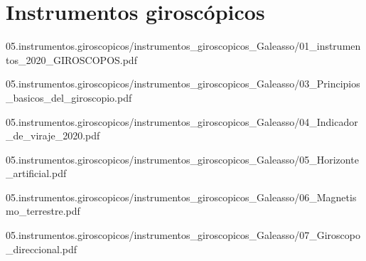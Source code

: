 


\chapter{Instrumentos girosc\'opicos}
\label{sec:instrumentos.giroscopicos}



\begin{landscape}

  
  {05.instrumentos.giroscopicos/instrumentos_giroscopicos_Galeasso/01_instrumentos_2020_GIROSCOPOS.pdf}

  
  {05.instrumentos.giroscopicos/instrumentos_giroscopicos_Galeasso/03_Principios_basicos_del_giroscopio.pdf}

  
  {05.instrumentos.giroscopicos/instrumentos_giroscopicos_Galeasso/04_Indicador_de_viraje_2020.pdf}

\end{landscape}

  
  {05.instrumentos.giroscopicos/instrumentos_giroscopicos_Galeasso/05_Horizonte_artificial.pdf}

  \begin{landscape}

  
  {05.instrumentos.giroscopicos/instrumentos_giroscopicos_Galeasso/06_Magnetismo_terrestre.pdf}

  
  {05.instrumentos.giroscopicos/instrumentos_giroscopicos_Galeasso/07_Giroscopo_direccional.pdf}
    
  \end{landscape}


